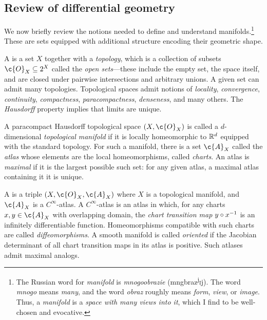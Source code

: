 \documentclass[11pt]{book}
\begin{document}
\subsection{Review of differential geometry}
We now briefly review the notions needed to define and understand manifolds.\footnote{The Russian word for \emph{manifold} is \emph{mnogoobrazie} (mngbr{\textquotesingle}az\textsuperscript{j}\textsc{i}j). The word \emph{mnogo} means \emph{many}, and the word \emph{obraz} roughly means \emph{form}, \emph{view}, or \emph{image}. 
Thus, a \emph{manifold} is a \emph{space with many views into it}, which I find to be well-chosen and evocative.}
These are sets equipped with additional structure encoding their geometric shape.

A  is a set $X$ together with a \emph{topology}, which is a collection of subsets $\c{O}_X \subseteq 2^X$ called the \emph{open sets}---these include the empty set, the space itself, and are closed under pairwise intersections and arbitrary unions.
A given set can admit many topologies.
Topological spaces admit notions of \emph{locality}, \emph{convergence}, \emph{continuity}, \emph{compactness}, \emph{paracompactness}, \emph{denseness}, and many others.
The \emph{Hausdorff} property implies that limits are unique.

A paracompact Hausdorff topological space $(X,\c{O}_X)$ is called a $d$-dimensional \emph{topological manifold} if it is locally homeomorphic to $\mathbb{R}^d$ equipped with the standard topology.
For such a manifold, there is a set $\c{A}_X$ called the \emph{atlas} whose elements are the local homeomorphisms, called \emph{charts}.
An atlas is \emph{maximal} if it is the largest possible such set: for any given atlas, a maximal atlas containing it it is unique.

A  is a triple  $(X,\c{O}_X,\c{A}_X)$ where $X$ is a topological manifold, and $\c{A}_X$ is a $C^\infty$-atlas.
A $C^\infty$-atlas is an atlas in which, for any charts $x,y \in \c{A}_X$ with overlapping domain, the \emph{chart transition map} $y\circ x^{-1}$ is an infinitely differentiable function.
Homeomorphisms compatible with such charts are called \emph{diffeomorphisms}.
A smooth manifold is called \emph{oriented} if the Jacobian determinant of all chart transition maps in its atlas is positive.
Such atlases admit maximal analogs.
\end{document}

